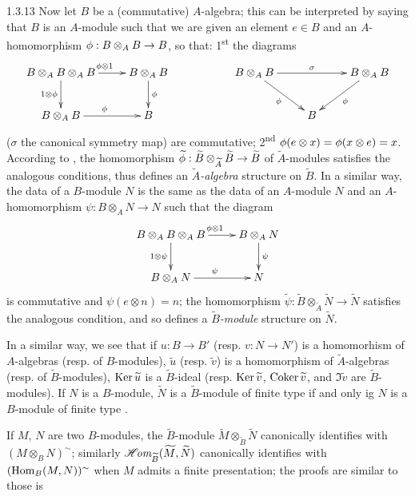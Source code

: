 \begin{env}{1.3.13}
\label{env-1.1.3.13}
Now let $B$ be a (commutative) $A$-algebra; this can be interpreted by saying that $B$ is an
$A$-module such that we are given an element $e\in B$ and an $A$-homomorphism
$\phi:B\otimes_A B\to B$, so that: 1\textsuperscript{st} the diagrams
\[
  \xymatrix{
    B\otimes_A B\otimes_A B\ar[r]^{\vphi\otimes 1}\ar[d]_{1\otimes\vphi} &
    B\otimes_A B\ar[d]^\vphi & &
    B\otimes_A B\ar[rr]^\sigma\ar[rd]_\vphi & &
    B\otimes_A B\ar[dl]^\vphi\\
    B\otimes_A B\ar[r]^\vphi &
    B & & & 
    B
  }
\]
($\sigma$ the canonical symmetry map) are commutative; 2\textsuperscript{nd}
$\phi(e\otimes x)=\phi(x\otimes e)=x$. According to , the homomorphism
$\widetilde{\phi}:\widetilde{B}\otimes_{\widetilde{A}}\widetilde{B}\to\widetilde{B}$ of
$\widetilde{A}$-modules satisfies the analogous conditions, thus defines an
\emph{$\widetilde{A}$-algebra} structure on $\widetilde{B}$. In a similar way, the data of
a $B$-module $N$ is the same as the data of an $A$-module $N$ and an $A$-homomorphism
$\psi:B\otimes_A N\to N$ such that the diagram
\[
  \xymatrix{
    B\otimes_A B\otimes_A B\ar[r]^{\vphi\otimes 1}\ar[d]_{1\otimes\psi} &
    B\otimes_A N\ar[d]^\psi\\
    B\otimes_A N\ar[r]^\psi &
    N
  }
\]
is commutative and $\psi(e\otimes n)=n$; the homomorphism
$\widetilde{\psi}:\widetilde{B}\otimes_{\widetilde{A}}\widetilde{N}\to\widetilde{N}$
satisfies the analogous condition, and so defines a \emph{$\widetilde{B}$-module} structure
on $\widetilde{N}$.

In a similar way, we see that if $u:B\to B'$ (resp. $v:N\to N'$) is a homomorhism of
$A$-algebras (resp. of $B$-modules), $\widetilde{u}$ (resp. $\widetilde{v}$) is a
homomorphism of $\widetilde{A}$-algebras (resp. of $\widetilde{B}$-modules),
${\mathop{\mathrm{Ker}}\nolimits}\,\widetilde{u}$ is a $\widetilde{B}$-ideal (resp. ${\mathop{\mathrm{Ker}}\nolimits}\,\widetilde{v}$,
${\mathop{\mathrm{Coker}}\nolimits}\,\widetilde{v}$, and $\Im\widetilde{v}$ are $\widetilde{B}$-modules). If $N$ is a
$B$-module, $\widetilde{N}$ is a $\widetilde{B}$-module of finite type if and only ig $N$
is a $B$-module of finite type .

If $M$, $N$ are two $B$-modules, the $\widetilde{B}$-module
$\widetilde{M}\otimes_{\widetilde{B}}\widetilde{N}$ canonically identifies with
$(M\otimes_B N)^\sim$; similarly $\mathscr{H}\!\textit{om}_{\widetilde{B}}(\widetilde{M},\widetilde{N})$
canonically identifies with $({\mathop{\mathrm{Hom}}\nolimits}_B(M,N))^\sim$ when $M$ admits a finite presentation; the
proofs are similar to those is 


\end{env}
